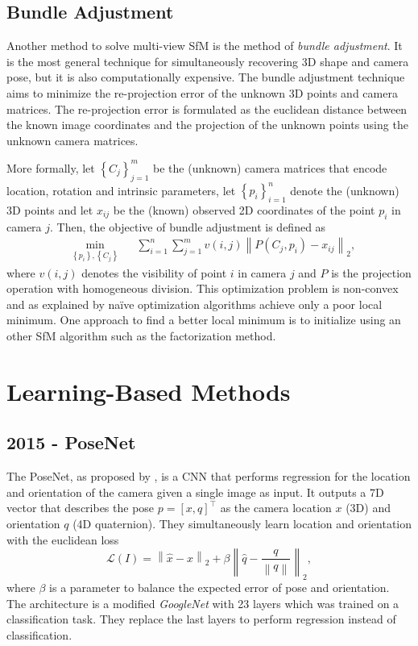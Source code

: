 	\subsection{Bundle Adjustment} 
		Another method to solve multi-view SfM is the method of \emph{bundle adjustment}.
		It is the most general technique for simultaneously recovering 3D shape and camera pose, but it is also computationally expensive.
		The bundle adjustment technique aims to minimize the re-projection error of the unknown 3D points and camera matrices.
		The re-projection error is formulated as the euclidean distance between the known image coordinates and the projection of the unknown points using the unknown camera matrices.
		
		More formally, let 
			$\left \lbrace C_j \right \rbrace_{j = 1}^{m}$ 
		be the (unknown) camera matrices that encode location, rotation and intrinsic parameters, let 
			$\left \lbrace p_i \right \rbrace_{i = 1}^{n}$ 
		denote the (unknown) 3D points and let $x_{ij}$ be the (known) observed 2D coordinates of the point $p_i$ in camera $j$.
		Then, the objective of bundle adjustment is defined as
		\begin{equation}\label{eq:bundle_adjustment}
			\begin{aligned}
				& \underset{\left\lbrace p_i \right\rbrace, \left\lbrace C_j \right\rbrace}{\text{min}}
				& & \sum_{i = 1}^{n} \sum_{j = 1}^{m} v(i, j) \left\| P(C_j, p_i) - x_{ij} \right\|_2 ,
			\end{aligned}
		\end{equation}
		where $v(i, j)$ denotes the visibility of point $i$ in camera $j$ and $P$ is the projection operation with homogeneous division.
		This optimization problem is non-convex and as explained by \cite{survey2017} na\"ive optimization algorithms achieve only a poor local minimum.
		One approach to find a better local minimum is to initialize using an other SfM algorithm such as the factorization method.
		
	
	\section{Learning-Based Methods}
	\subsection{2015 - PoseNet}
		The PoseNet, as proposed by \cite{kendall2015posenet}, is a CNN that performs regression for the location and orientation of the camera given a single image as input.
		It outputs a 7D vector that describes the pose $p = [x, q]^\top$ as the camera location $x$ (3D) and orientation $q$ (4D quaternion).
		They simultaneously learn location and orientation with the euclidean loss
		\begin{equation}
			\mathcal{L}(I) = 
			\left\|
				\hat{x} - x 
			\right\|_2 
			+ \beta 
			\left\| 
				\hat{q} - \frac{q}{\left\| q \right\|} 
			\right\|_2,
		\end{equation}
		where $\beta$ is a parameter to balance the expected error of pose and orientation.
		The architecture is a modified \emph{GoogleNet} with 23 layers which was trained on a classification task.
		They replace the last layers to perform regression instead of classification.
		

